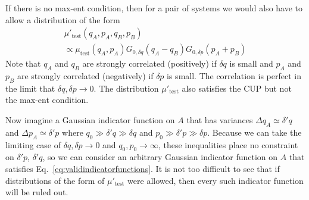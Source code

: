 \documentclass[pra,superscriptaddress,nofootinbib,12pt]{revtex4-2}
\begin{document}
If there is no max-ent condition, then for a pair of systems we would also have to allow a distribution of the form
\begin{multline}
\mu'_{\textrm{test}}(q_A,p_A,q_B,p_B) \\ \nonumber
\propto \mu_{\textrm{test}}(q_A,p_A)
G_{0,\delta q} (q_A-q_B ) G_{0,\delta p} (p_A + p_B )
\end{multline}
Note that $q_A$ and $q_B$ are strongly correlated (positively) if $\delta q$ is small and $p_A$ and $p_B$ are strongly correlated (negatively) if $\delta p$ is small. The correlation is perfect in the limit that $\delta q, \delta p \to 0$. The distribution $\mu'_{\textrm{test}}$ also satisfies the CUP but not the max-ent condition.

Now imagine a Gaussian indicator function on $A$ that has variances $\Delta q_A \simeq \delta' q$ and $\Delta p_A \simeq \delta' p$ where $q_0 \gg \delta' q \gg \delta q$ and $p_0 \gg \delta' p \gg \delta p$.
Because we can take the limiting case of $\delta q, \delta p \to 0$ and $q_0,p_0 \to \infty$, these inequalities place no constraint on $\delta' p$, $\delta' q$, so we can consider an arbitrary Gaussian indicator function on $A$ that satisfies Eq.~\eqref{eq:validindicatorfunctions}. It is not too difficult to see that if distributions of the form of $\mu'_{\textrm{test}}$ were allowed, then every such indicator function will be ruled out.
\end{document}
